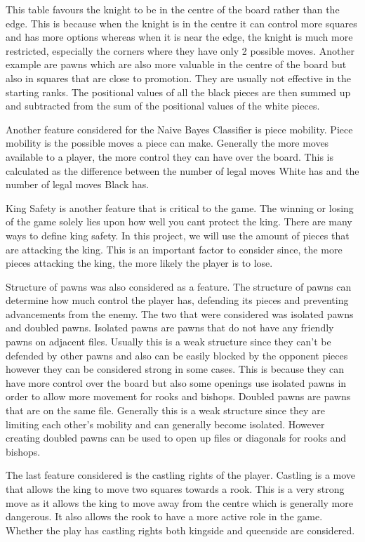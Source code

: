 This table favours the knight to be in the centre of the board rather than the edge. This is because when the knight is in the centre it can control more squares and has more options whereas when it is near the edge, the knight is much more restricted, especially the corners where they have only 2 possible moves. Another example are pawns which are also more valuable in the centre of the board but also in squares that are close to promotion. They are usually not effective in the starting ranks. The positional values of all the black pieces are then summed up and subtracted from the sum of the positional values of the white pieces.

Another feature considered for the Naive Bayes Classifier is piece mobility. Piece mobility is the possible moves a piece can make. Generally the more moves available to a player, the more control they can have over the board. This is calculated as the difference between the number of legal moves White has and the number of legal moves Black has.

King Safety is another feature that is critical to the game. The winning or losing of the game solely lies upon how well you cant protect the king. There are many ways to define king safety. In this project, we will use the amount of pieces that are attacking the king. This is an important factor to consider since, the more pieces attacking the king, the more likely the player is to lose.

Structure of pawns was also considered as a feature. The structure of pawns can determine how much control the player has, defending its pieces and preventing advancements from the enemy. The two that were considered was isolated pawns and doubled pawns. Isolated pawns are pawns that do not have any friendly pawns on adjacent files. Usually this is a weak structure since they can't be defended by other pawns and also can be easily blocked by the opponent pieces however they can be considered strong in some cases. This is because they can have more control over the board but also some openings use isolated pawns in order to allow more movement for rooks and bishops. Doubled pawns are pawns that are on the same file. Generally this is a weak structure since they are limiting each other's mobility and can generally become isolated. However creating doubled pawns can be used to open up files or diagonals for rooks and bishops.

The last feature considered is the castling rights of the player. Castling is a move that allows the king to move two squares towards a rook. This is a very strong move as it allows the king to move away from the centre which is generally more dangerous. It also allows the rook to have a more active role in the game. Whether the play has castling rights both kingside and queenside are considered. 

